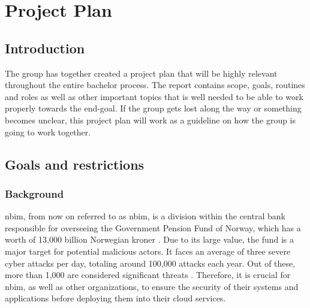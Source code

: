 




\chapter{Project Plan}
\label{app:additional}



\section{Introduction}
The group has together created a project plan that will be highly relevant throughout the entire bachelor process. The report contains scope, goals, routines and roles as well as other important topics that is well needed to be able to work properly towards the end-goal. If the group gets lost along the way or something becomes unclear, this project plan will work as a guideline on how the group is going to work together. 

\newpage
\section{Goals and restrictions}
\subsection{Background}
\acrlong{nbim}, from now on referred to as \acrshort{nbim}, is a division within the central bank responsible for overseeing the Government Pension Fund of Norway, which has a worth of 13,000 billion Norwegian kroner \cite{nbimwebsite}. Due to its large value, the fund is a major target for potential malicious actors. It faces an average of three severe cyber attacks per day, totaling around 100,000 attacks each year. Out of these, more than 1,000 are considered significant threats \cite{nbimattacks}. Therefore, it is crucial for \acrshort{nbim}, as well as other organizations, to ensure the security of their systems and applications before deploying them into their cloud services. 

